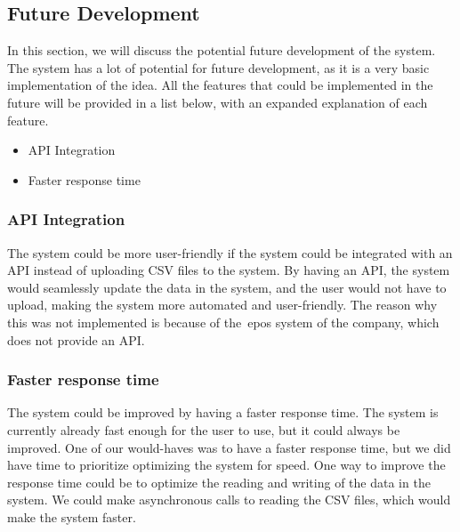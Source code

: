 \subsection{Future Development}\label{subsec:future-development}

In this section, we will discuss the potential future development of the system.
The system has a lot of potential for future development, as it is a very basic implementation of the idea.
All the features that could be implemented in the future will be provided in a list below, with an expanded
explanation of each feature.

\begin{itemize}
    \item API Integration

    \item Faster response time
\end{itemize}

\subsubsection{API Integration}

The system could be more user-friendly if the system could be integrated with an API instead of uploading CSV files
to the system.
By having an API, the system would seamlessly update the data in the system, and the user would not have to upload,
making the system more automated and user-friendly.
The reason why this was not implemented is because of the~\acrshort{epos} system of the company, which does not provide
an API\@.

\subsubsection{Faster response time}

The system could be improved by having a faster response time.
The system is currently already fast enough for the user to use, but it could always be improved.
One of our would-haves was to have a faster response time, but we did have time to prioritize optimizing the system
for speed.
One way to improve the response time could be to optimize the reading and writing of the data in the system.
We could make asynchronous calls to reading the CSV files, which would make the system faster.
